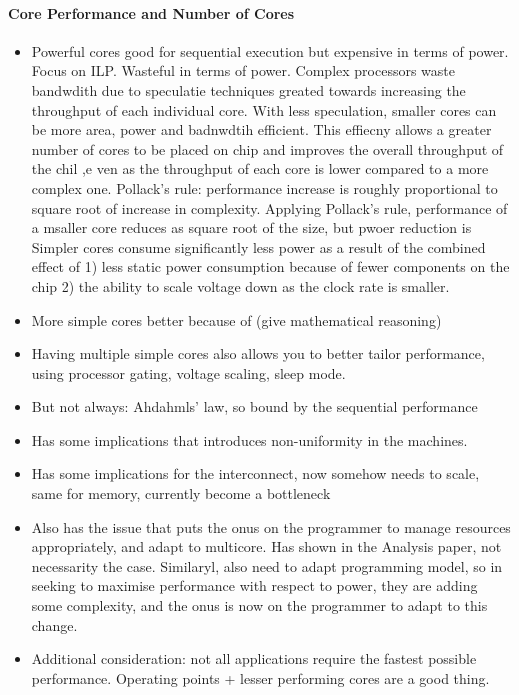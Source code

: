 \paragraph{Core Performance and Number of Cores}
\begin{itemize}
\item Powerful cores good for sequential execution but expensive
in terms of power. Focus on ILP. Wasteful in terms of power. 
Complex processors waste bandwdith due to 
speculatie techniques greated towards increasing the throughput
of each individual core. With less speculation, smaller cores can be more
area, power and badnwdtih efficient. This effiecny allows
a greater number of cores to be placed on chip and improves the overall
throughput of the chil ,e ven as the throughput of each core is lower compared to a more 
complex one. Pollack's rule: performance increase is roughly proportional to square root 
of increase in complexity. Applying Pollack's rule, 
performance of a msaller core reduces as square root of the size, but pwoer reduction is 
Simpler cores consume significantly less power as
a result of the combined effect of 1) less static power consumption because 
of fewer components on the chip 2) the ability to scale voltage down as
the clock rate is smaller.
\item More simple cores better because of (give mathematical reasoning)
\item Having multiple simple cores also allows you to better tailor
performance, using processor gating, voltage scaling, sleep mode. 
\item But not always: Ahdahmls' law, so bound by the sequential performance
\item Has some implications that introduces non-uniformity in the machines. 
\item Has some implications for the interconnect, now somehow needs to scale,
same for memory, currently become a bottleneck
\item Also has the issue that puts the onus on the programmer to manage 
resources appropriately, and adapt to multicore. Has shown in 
the Analysis paper, not necessarity the case. Similaryl, 
also need to adapt programming model, so in seeking to maximise 
performance with respect to power, they are adding some complexity, 
and the onus is now on the programmer to adapt to this change. 
\item Additional consideration: not all applications require the fastest
possible performance. Operating points + lesser performing cores
are a good thing. 
\end{itemize}
